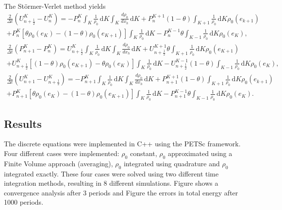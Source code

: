 \documentclass{article}
\begin{document}
The St\"{o}rmer-Verlet method yields
\begin{equation}
	\begin{aligned}
		\frac{2}{\Delta t} \left(U_{n+\frac{1}{2}}^K-U_n^K\right) = -P^K_n  \int_K \! \frac{1}{\rho_0} \, \mathrm{d}K   \int_K \! \frac{d \rho_0}{d x_h} \, \mathrm{d}K + P^{K+1}_n (1-\theta) \int_{K+1} \! \frac{1}{\rho_0} \, \mathrm{d}K \rho_0(e_{k+1}) \\
		+ P^K_n [\theta \rho_0(e_K) - (1-\theta) \rho_0(e_{K+1})] \int_K \! \frac{1}{\rho_0} \, \mathrm{d}K - P^{K-1}_n \theta \int_{K-1} \! \frac{1}{\rho_0} \, \mathrm{d}K \rho_0(e_K), \\
		\frac{2}{\Delta t} \left(P_{n+1}^K-P_n^K\right) = U^K_{n+\frac{1}{2}} \int_K \! \frac{1}{\rho_0} \, \mathrm{d}K   \int_K \! \frac{d \rho_0}{d x_h} \, \mathrm{d}K + U^{K+1}_{n+\frac{1}{2}} \theta \int_{K+1} \! \frac{1}{\rho_0} \, \mathrm{d}K \rho_0(e_{K+1}) \\
		+ U^K_{n+\frac{1}{2}} [(1-\theta) \rho_0(e_{K+1}) - \theta \rho_0(e_K)] \int_K \! \frac{1}{\rho_0} \, \mathrm{d}K - U^{K-1}_{n+\frac{1}{2}} (1-\theta) \int_{K-1} \! \frac{1}{\rho_0} \, \mathrm{d}K \rho_0(e_K), \\
	\frac{2}{\Delta t} \left(U_{n+1}^K-U_{n+\frac{1}{2}}^K\right) = -P^K_{n+1}  \int_K \! \frac{1}{\rho_0} \, \mathrm{d}K   \int_K \! \frac{d \rho_0}{d x_h} \, \mathrm{d}K + P^{K+1}_{n+1} (1-\theta) \int_{K+1} \! \frac{1}{\rho_0} \, \mathrm{d}K \rho_0(e_{k+1}) \\
		+ P^K_{n+1} [\theta \rho_0(e_K) - (1-\theta) \rho_0(e_{K+1})] \int_K \! \frac{1}{\rho_0} \, \mathrm{d}K - P^{K-1}_{n+1} \theta \int_{K-1} \! \frac{1}{\rho_0} \, \mathrm{d}K \rho_0(e_K).	
	\end{aligned}
\end{equation}

\subsection{Results}
The discrete equations were implemented in C++ using the PETSc framework. Four different cases were implemented: $\rho_0$ constant, $\rho_0$ approximated using a Finite Volume approach (averaging), $\rho_0$ integrated using quadrature and $\rho_0$ integrated exactly. These four cases were solved using two different time integration methods, resulting in 8 different simulations. Figure shows a convergence analysis after 3 periods and Figure the errors in total energy after 1000 periods.
\end{document}
